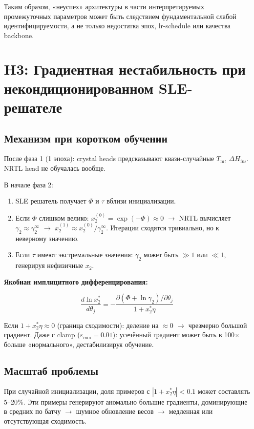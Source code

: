 \documentclass[11pt]{article}
\begin{document}
Таким образом, «неуспех» архитектуры в части интерпретируемых промежуточных параметров может быть следствием фундаментальной слабой идентифицируемости, а не только недостатка эпох, lr-schedule или качества backbone.
\section{H3: Градиентная нестабильность при некондиционированном SLE-решателе}

\subsection{Механизм при коротком обучении}

После фаза 1 (1 эпоха): crystal heads предсказывают квази-случайные $T_{\mathrm{m}}$, $\Delta H_{\mathrm{fus}}$. NRTL head не обучалась вообще.

В начале фаза 2:

\begin{enumerate}
  \item SLE решатель получает $\Phi$ и $\tau$ вблизи инициализации.
  \item Если $\Phi$ слишком велико: $x_2^{(0)} = \exp(-\Phi) \approx 0$ $\to$ NRTL вычисляет $\gamma_2 \approx \gamma_2^\infty$ $\to$ $x_2^{(1)} \approx x_2^{(0)}/\gamma_2^\infty$. Итерации сходятся тривиально, но к неверному значению.
  \item Если $\tau$ имеют экстремальные значения: $\gamma_2$ может быть $\gg 1$ или $\ll 1$, генерируя нефизичные $x_2$.
\end{enumerate}

\textbf{Якобиан имплицитного дифференцирования:}

\begin{equation*}
\frac{d\ln x_2^*}{d\theta_j} = -\frac{\partial(\Phi + \ln\gamma_2)/\partial\theta_j}{1 + x_2^* \eta}
\end{equation*}

Если $1 + x_2^* \eta \approx 0$ (граница сходимости): деление на $\approx 0$ $\to$ чрезмерно большой градиент. Даже с clamp ($\varepsilon_{\min} = 0.01$): усечённый градиент может быть в 100$\times$ больше «нормального», дестабилизируя обучение.

\subsection{Масштаб проблемы}

При случайной инициализации, доля примеров с $|1 + x_2^* \eta| < 0.1$ может составлять 5--20\%. Эти примеры генерируют аномально большие градиенты, доминирующие в средних по батчу $\to$ шумное обновление весов $\to$ медленная или отсутствующая сходимость.
\end{document}
